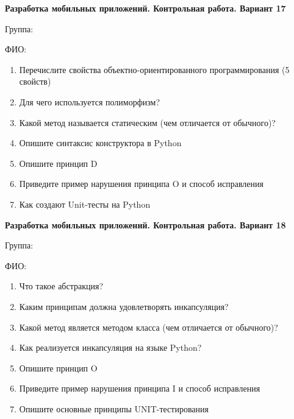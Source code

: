 \documentclass[12pt]{article}
\begin{document}
\vspace{40pt}\begin{minipage}{\textwidth}
\textbf{Разработка мобильных приложений. Контрольная работа. Вариант 17}

Группа: \underline{\hspace{3cm}}

ФИО: \underline{\hspace{10cm}}

\begin{enumerate}
\item Перечислите свойства объектно-ориентированного программирования (5 свойств)
\item Для чего используется полиморфизм?
\item Какой метод называется статическим (чем отличается от обычного)?
\item Опишите синтаксис конструктора в Python
\item Опишите принцип D
\item Приведите пример нарушения принципа O и способ исправления
\item Как создают Unit-тесты на Python

\end{enumerate}
\end{minipage}

\vspace{40pt}\begin{minipage}{\textwidth}
\textbf{Разработка мобильных приложений. Контрольная работа. Вариант 18}

Группа: \underline{\hspace{3cm}}

ФИО: \underline{\hspace{10cm}}

\begin{enumerate}
\item Что такое абстракция?
\item Каким принципам должна удовлетворять инкапсуляция?
\item Какой метод является методом класса (чем отличается от обычного)?
\item Как реализуется инкапсуляция на языке Python?
\item Опишите принцип O
\item Приведите пример нарушения принципа I и способ исправления
\item Опишите основные принципы UNIT-тестирования

\end{enumerate}
\end{minipage}
\end{document}
